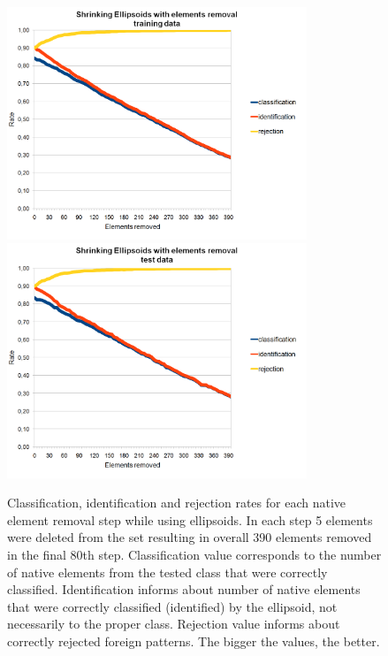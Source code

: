 \begin{figure}[htp]
	\centering
	\includegraphics[width=0.80\textwidth]{Figures/charts/DIGITS/DIGITS_ShrinkingEllipsoidsElementsRemovalTraining.png}
	\hspace{12pt}
	\includegraphics[width=0.80\textwidth]{Figures/charts/DIGITS/DIGITS_ShrinkingEllipsoidsElementsRemovalTest.png}
	\caption{ Classification, identification and rejection rates for each native element removal step while using ellipsoids. In each step 5 elements were deleted from the set resulting in overall 390 elements removed in the final 80th step. Classification value corresponds to the number of native elements from the tested class that were correctly classified. Identification informs about number of native elements that were correctly classified (identified) by the ellipsoid, not necessarily to the proper class. Rejection value informs about correctly rejected foreign patterns. The bigger the values, the better. }
	\label{fig:shrinking_ellipsoids_elements_rejection}\vspace{-3pt}
\end{figure}

